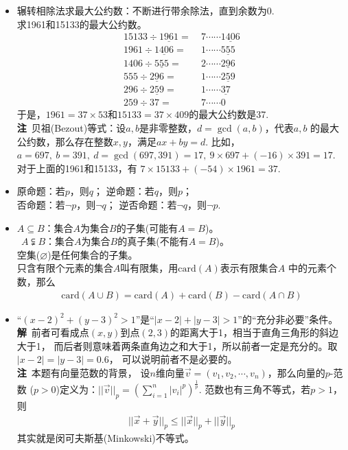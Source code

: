 \begin{itemize}[leftmargin=\inteval{\myitemleftmargin}pt,itemsep=
   \inteval{\myitemitempsep}pt,topsep=\inteval{\myitemtopsep}pt]
\item 辗转相除法求最大公约数：不断进行带余除法，直到余数为0. \\
求1961和15133的最大公约数。
\begin{align*}
    15133\div \underline{1961} =&\ 7\cdots\cdots \underline{1406} \\
    1961\div \underline{1406} =&\ 1\cdots\cdots \underline{555} \\
    1406\div \underline{555} =&\ 2\cdots\cdots \underline{296} \\
    555\div \underline{296} =&\ 1\cdots\cdots \underline{259} \\
    296\div \underline{259} =&\ 1\cdots\cdots \underline{37} \\
    259\div 37 =&\ 7\cdots\cdots 0
\end{align*}
于是，$ 1961=37\times 53 $和$ 15133=37\times409 $的最大公约数是37.\\
\textbf{注}\ 贝祖(Bezout)等式：设$ a,b $是非零整数，$ d=\gcd(a,b) $，代表$ a,b $
的最大公约数，那么存在整数$ x,y $，满足$ ax+by=d $. 比如，$ a=697,\ b=391,\ d=\gcd(697,391)=17,\ 9\times 697+(-16)\times 391=17 $. 对于上面的1961和15133，有
$ 7\times 15133+(-54)\times 1961=37 $. 

\item 原命题：若$ p $，则$ q $；
逆命题：若$ q $，则$ p $；\\
否命题：若$ \neg p $，则$ \neg q $；
逆否命题：若$ \neg q $，则$ \neg p $. 

\item $ A \subseteq B $：集合$ A $为集合$ B $的子集(可能有$ A=B $)。\\
$ \ \ A \subsetneqq B $：集合$ A $为集合$ B $的真子集(不能有$ A=B $)。\\
空集($ \varnothing $)是任何集合的子集。\\
只含有限个元素的集合$ A $叫有限集，用$ \mathrm{card}(A) $表示有限集合$ A $
中的元素个数，那么
\begin{gather*}
    \mathrm{card}(A\cup B)=\mathrm{card}(A)+\mathrm{card}(B)-
    \mathrm{card}(A\cap B)
\end{gather*}

\item “$ (x-2)^2+(y-3)^2>1 $”是“$ |x-2|+|y-3|>1 $”的“充分非必要”条件。\\
\textbf{解}\ 前者可看成点$ (x,y) $到点$ (2,3) $的距离大于1，相当于直角三角形的斜边大于1，
而后者则意味着两条直角边之和大于1，所以前者一定是充分的。取$ |x-2|=|y-3|=0.6 $，
可以说明前者不是必要的。\\
\textbf{注}\ 本题有向量范数的背景，
设$ n $维向量$ \vec{v}=(v_1,v_2,\cdots,v_n) $，那么向量的$ p $-范数
($ p > 0 $)定义为：$ ||\vec{v}||_p
=\left(\sum\limits_{i=1}^n |v_i|^p\right)^{\frac{1}{p}} $. 
范数也有三角不等式，若$ p>1 $，则
\begin{align*}
    ||\vec{x}+\vec{y}||_p\leq
    ||\vec{x}||_p+||\vec{y}||_p
\end{align*}
其实就是闵可夫斯基(Minkowski)不等式。


\end{itemize}
